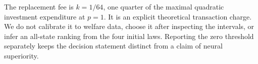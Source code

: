 The replacement fee is $k=1/64$, one quarter of the maximal quadratic investment expenditure at $p=1$. It is an explicit theoretical transaction charge. We do not calibrate it to welfare data, choose it after inspecting the intervals, or infer an all-state ranking from the four initial laws. Reporting the zero threshold separately keeps the decision statement distinct from a claim of neural superiority.
